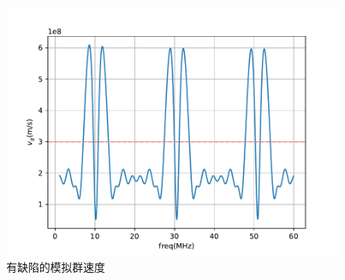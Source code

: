 \documentclass[fleqn,10pt]{SelfArx} %
\begin{document}
\begin{figure}[htbp]
	\centering
	\includegraphics[width=\linewidth]{simd-vg.pdf}
	\caption{有缺陷的模拟群速度}
	\label{fig:a12}
\end{figure}
\end{document}
